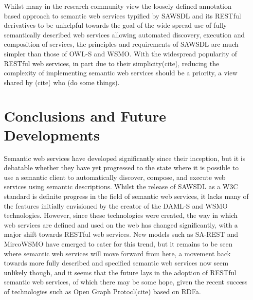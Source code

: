 Whilst many in the research community view the loosely defined annotation based approach
to semantic web services typified by SAWSDL and its RESTful derivatives to be
unhelpful towards the goal of the wide-spread use of fully semantically
described web services allowing automated discovery, execution and composition
of services\cite{battle_report_???}, the principles and requirements of SAWSDL are much simpler
than those of OWL-S and WSMO\cite{kopecky_sawsdl:_2007}. With the widespread popularity of RESTful
web services, in part due to their simplicity(cite), reducing the complexity of
implementing semantic web services should be a priority, a view shared by
(cite) who (do some things). 

\section{Conclusions and Future Developments}

Semantic web services have developed significantly since their inception, but it
is debatable whether they have yet progressed to the state where it is possible
to use a semantic client to automatically discover, compose, and execute web
services using semantic descriptions. Whilst the release of SAWSDL as a W3C
standard is definite progress in the field of semantic web services, it lacks
many of the features initially envisioned by the creator of the DAML-S and WSMO
technologies. However, since these technologies were created, the way in which
web services are defined and used on the web has changed significantly, with a
major shift towards RESTful web services. New models such as SA-REST and
MircoWSMO have emerged to cater for this trend, but it remains to be seen where
semantic web services will move forward from here, a movement back towards more
fully described and specified semantic web services now seem unlikely though,
and it seems that the future lays in the adoption of RESTful semantic web
services, of which there may be some hope, given the recent success of
technologies such as Open Graph Protocl(cite) based on RDFa.

